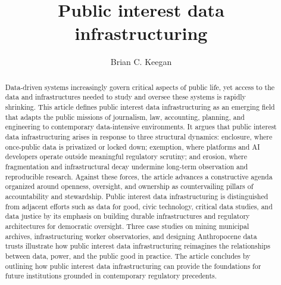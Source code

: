\documentclass[acmsmall,screen]{acmart}
\begin{document}
\title{Public interest data infrastructuring}

\author{Brian C. Keegan}

\renewcommand{\shortauthors}{Keegan}

\begin{abstract}
Data-driven systems increasingly govern critical aspects of public life, yet access to the data and infrastructures needed to study and oversee these systems is rapidly shrinking. This article defines public interest data infrastructuring as an emerging field that adapts the public missions of journalism, law, accounting, planning, and engineering to contemporary data-intensive environments. It argues that public interest data infrastructuring arises in response to three structural dynamics: enclosure, where once-public data is privatized or locked down; exemption, where platforms and AI developers operate outside meaningful regulatory scrutiny; and erosion, where fragmentation and infrastructural decay undermine long-term observation and reproducible research. Against these forces, the article advances a constructive agenda organized around openness, oversight, and ownership as countervailing pillars of accountability and stewardship. Public interest data infrastructuring is distinguished from adjacent efforts such as data for good, civic technology, critical data studies, and data justice by its emphasis on building durable infrastructures and regulatory architectures for democratic oversight. Three case studies on mining municipal archives, infrastructuring worker observatories, and designing Anthropocene data trusts illustrate how public interest data infrastructuring reimagines the relationships between data, power, and the public good in practice. The article concludes by outlining how public interest data infrastructuring can provide the foundations for future institutions grounded in contemporary regulatory precedents.
\end{abstract}
\end{document}
